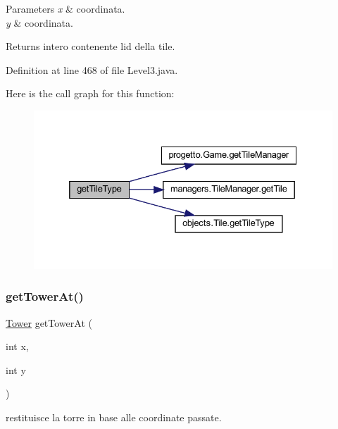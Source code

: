 \begin{DoxyParams}{Parameters}
{\em x} & coordinata. \\
\hline
{\em y} & coordinata.\\
\hline
\end{DoxyParams}
\begin{DoxyReturn}{Returns}
intero contenente l\textquotesingle{}id della tile. 
\end{DoxyReturn}


Definition at line 468 of file Level3.\+java.

Here is the call graph for this function\+:\nopagebreak
\begin{figure}[H]
\begin{center}
\leavevmode
\includegraphics[width=332pt]{classscenes_1_1_level3_ac689e72523c8460ac3160526d310b1b7_cgraph}
\end{center}
\end{figure}
\mbox{\label{classscenes_1_1_level3_a4345f2e80059788e5ab1dd1cf0ff2c04}} 
\subsubsection{\texorpdfstring{get\+Tower\+At()}{getTowerAt()}}
{\footnotesize\ttfamily \hyperlink{classtowers_1_1_tower}{Tower} get\+Tower\+At (\begin{DoxyParamCaption}\item[{int}]{x,  }\item[{int}]{y }\end{DoxyParamCaption})\hspace{0.3cm}{\ttfamily [private]}}



restituisce la torre in base alle coordinate passate. 


